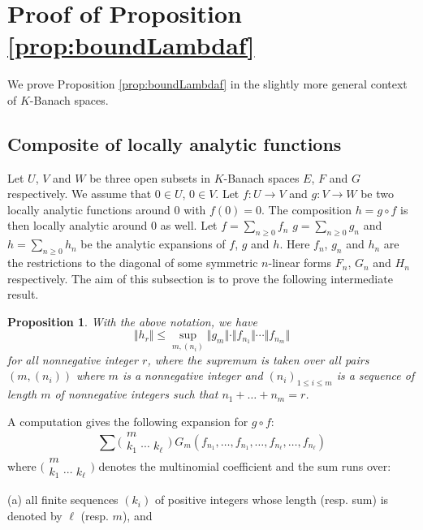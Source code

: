 \documentclass{sig-alternate}
\newtheorem{prop}[theo]{Proposition}
\def\binom#1#2{\Big(\begin{array}{cc} #1 \\ #2 \end{array}\Big)}
\begin{document}
\appendix

\section{Proof of Proposition \ref{prop:boundLambdaf}}
\label{app:proof}

We prove Proposition \ref{prop:boundLambdaf} in the slightly more
general context of $K$-Banach spaces.

\subsection{Composite of locally analytic functions}

Let $U$, $V$ and $W$ be three open subsets in $K$-Banach spaces 
$E$, $F$ and $G$ respectively. We assume that $0 \in U$, $0 \in V$. Let 
$f : U \to V$ and $g : V \to W$ be two locally analytic functions around 
$0$ with $f(0) = 0$. The composition $h = g \circ f$ is then locally 
analytic around $0$ as well. Let $f = \sum_{n \geq 0} f_n$
$g = \sum_{n \geq 0} g_n$ and $h = \sum_{n \geq 0} h_n$ be the
analytic expansions of $f$, $g$ and $h$.
Here $f_n$, $g_n$ and $h_n$ are the restrictions to the diagonal of 
some symmetric $n$-linear forms $F_n$, $G_n$ and $H_n$ respectively. The 
aim of this subsection is to prove the following intermediate result.

\begin{prop}
\label{prop:boundhr}
With the above notation, we have
$$\Vert h_r \Vert \leq \sup_{m, (n_i)}
  \Vert g_m \Vert \cdot \Vert f_{n_1} \Vert \cdots \Vert f_{n_m} \Vert$$
for all nonnegative integer $r$, where the supremum is taken over all pairs $(m, (n_i))$ where $m$
is a nonnegative integer and $(n_i)_{1 \leq i \leq m}$ is a sequence of
length $m$ of nonnegative integers such that $n_1 + \ldots + n_m = r$.
\end{prop}

A computation gives the following expansion for $g \circ f$:
\begin{equation}
\label{eq:expansiongf}
\sum \binom m {\!k_1 \,\, \cdots \,\, k_\ell\!} \:
G_m(f_{n_1}, \ldots, f_{n_1}, \ldots, f_{n_\ell}, \ldots, f_{n_\ell})
\end{equation}
where $\binom m {\!k_1 \,\, \cdots \,\, k_\ell\!}$ denotes the
multinomial coefficient and the sum runs over:

\noindent
(a) all finite sequences $(k_i)$ of positive integers whose length 
(resp. sum) is denoted by $\ell$ (resp. $m$), and
\end{document}
